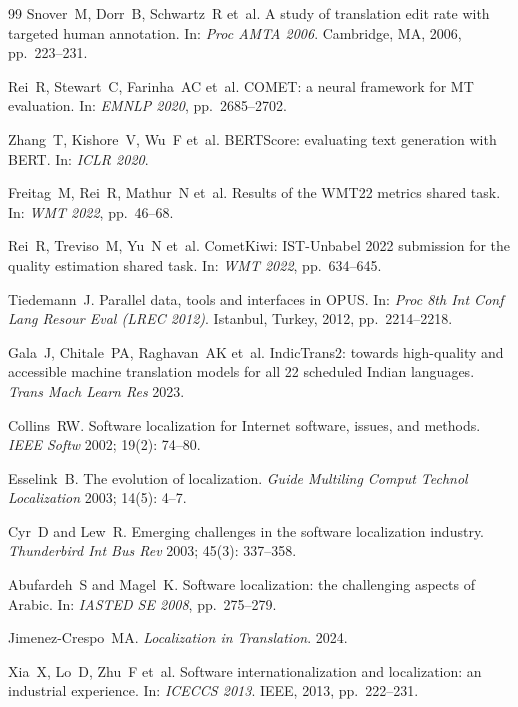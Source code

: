 \documentclass[pdflatex,sn-mathphys-num]{sn-jnl}
\begin{document}
\begin{thebibliography}{99}
Snover~M, Dorr~B, Schwartz~R et~al.
\newblock A study of translation edit rate with targeted human annotation.
\newblock In: \emph{Proc AMTA 2006}. Cambridge, MA, 2006, pp.~223--231.

Rei~R, Stewart~C, Farinha~AC et~al.
\newblock COMET: a neural framework for MT evaluation.
\newblock In: \emph{EMNLP 2020}, pp.~2685--2702.

Zhang~T, Kishore~V, Wu~F et~al.
\newblock BERTScore: evaluating text generation with BERT.
\newblock In: \emph{ICLR 2020}.

Freitag~M, Rei~R, Mathur~N et~al.
\newblock Results of the WMT22 metrics shared task.
\newblock In: \emph{WMT 2022}, pp.~46--68.

Rei~R, Treviso~M, Yu~N et~al.
\newblock CometKiwi: IST-Unbabel 2022 submission for the quality estimation shared task.
\newblock In: \emph{WMT 2022}, pp.~634--645.

Tiedemann~J.
\newblock Parallel data, tools and interfaces in OPUS.
\newblock In: \emph{Proc 8th Int Conf Lang Resour Eval (LREC 2012)}. Istanbul, Turkey, 2012, pp.~2214--2218.

Gala~J, Chitale~PA, Raghavan~AK et~al.
\newblock IndicTrans2: towards high-quality and accessible machine translation models for all 22 scheduled Indian languages.
\newblock \emph{Trans Mach Learn Res} 2023.

Collins~RW.
\newblock Software localization for Internet software, issues, and methods.
\newblock \emph{IEEE Softw} 2002; 19(2): 74--80.

Esselink~B.
\newblock The evolution of localization.
\newblock \emph{Guide Multiling Comput Technol Localization} 2003; 14(5): 4--7.

Cyr~D and Lew~R.
\newblock Emerging challenges in the software localization industry.
\newblock \emph{Thunderbird Int Bus Rev} 2003; 45(3): 337--358.

Abufardeh~S and Magel~K.
\newblock Software localization: the challenging aspects of Arabic.
\newblock In: \emph{IASTED SE 2008}, pp.~275--279.

Jimenez-Crespo~MA.
\newblock \emph{Localization in Translation}. 2024.

Xia~X, Lo~D, Zhu~F et~al.
\newblock Software internationalization and localization: an industrial experience.
\newblock In: \emph{ICECCS 2013}. IEEE, 2013, pp.~222--231.


\end{thebibliography}
\end{document}
